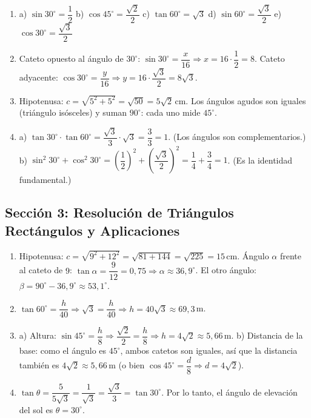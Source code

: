 \documentclass[12pt, letterpaper]{article}
\providecommand{\sen}{\sin}
\begin{document}
  \begin{enumerate}[leftmargin=*, label=\textbf{\arabic*.}]
    \item a) $\sen 30^{\circ} = \dfrac{1}{2}$ \quad b) $\cos 45^{\circ} = \dfrac{\sqrt{2}}{2}$ \quad c) $\tan 60^{\circ} = \sqrt{3}$ \quad d) $\sen 60^{\circ} = \dfrac{\sqrt{3}}{2}$ \quad e) $\cos 30^{\circ} = \dfrac{\sqrt{3}}{2}$

    \item Cateto opuesto al ángulo de $30^{\circ}$: $\sen 30^{\circ} = \dfrac{x}{16} \Rightarrow x = 16 \cdot \dfrac{1}{2} = 8$.
          Cateto adyacente: $\cos 30^{\circ} = \dfrac{y}{16} \Rightarrow y = 16 \cdot \dfrac{\sqrt{3}}{2} = 8\sqrt{3}$.

    \item Hipotenusa: $c = \sqrt{5^2 + 5^2} = \sqrt{50} = 5\sqrt{2}$\,cm.
          Los ángulos agudos son iguales (triángulo isósceles) y suman $90^{\circ}$: cada uno mide $45^{\circ}$.

    \item a) $\tan 30^{\circ} \cdot \tan 60^{\circ} = \dfrac{\sqrt{3}}{3} \cdot \sqrt{3} = \dfrac{3}{3} = 1$. (Los ángulos son complementarios.)
          \quad b) $\sen^2 30^{\circ} + \cos^2 30^{\circ} = \left(\dfrac{1}{2}\right)^2 + \left(\dfrac{\sqrt{3}}{2}\right)^2 = \dfrac{1}{4} + \dfrac{3}{4} = 1$. (Es la identidad fundamental.)
  \end{enumerate}

  \newpage

  \subsection*{Sección 3: Resolución de Triángulos Rectángulos y Aplicaciones}

  \begin{enumerate}[leftmargin=*, label=\textbf{\arabic*.}]
    \item Hipotenusa: $c = \sqrt{9^2 + 12^2} = \sqrt{81 + 144} = \sqrt{225} = 15$\,cm.
          Ángulo $\alpha$ frente al cateto de $9$: $\tan \alpha = \dfrac{9}{12} = 0{,}75 \Rightarrow \alpha \approx 36{,}9^{\circ}$.
          El otro ángulo: $\beta = 90^{\circ} - 36{,}9^{\circ} \approx 53{,}1^{\circ}$.

    \item $\tan 60^{\circ} = \dfrac{h}{40} \Rightarrow \sqrt{3} = \dfrac{h}{40} \Rightarrow h = 40\sqrt{3} \approx 69{,}3$\,m.

    \item a) Altura: $\sen 45^{\circ} = \dfrac{h}{8} \Rightarrow \dfrac{\sqrt{2}}{2} = \dfrac{h}{8} \Rightarrow h = 4\sqrt{2} \approx 5{,}66$\,m.
          \quad b) Distancia de la base: como el ángulo es $45^{\circ}$, ambos catetos son iguales, así que la distancia también es $4\sqrt{2} \approx 5{,}66$\,m
          (o bien $\cos 45^{\circ} = \dfrac{d}{8} \Rightarrow d = 4\sqrt{2}$).

    \item $\tan \theta = \dfrac{5}{5\sqrt{3}} = \dfrac{1}{\sqrt{3}} = \dfrac{\sqrt{3}}{3} = \tan 30^{\circ}$. Por lo tanto, el ángulo de elevación del sol es $\theta = 30^{\circ}$.
  \end{enumerate}

\fi
\end{document}
